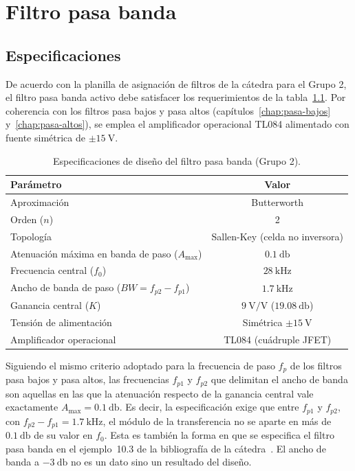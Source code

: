 \chapter{Filtro pasa banda}
\label{chap:pasa-banda}

\section{Especificaciones}
\label{sec:pbd-especificaciones}

De acuerdo con la planilla de asignación de filtros de la cátedra para el Grupo 2, el filtro pasa banda activo debe
satisfacer los requerimientos de la tabla~\ref{tab:pbd-especificaciones}. Por coherencia con los filtros pasa bajos y
pasa altos (capítulos~\ref{chap:pasa-bajos} y~\ref{chap:pasa-altos}), se emplea el amplificador operacional TL084
alimentado con fuente simétrica de $\pm\SI{15}{\volt}$.

\begin{table}[!ht]
  \centering
  \begin{tabular}{|l|c|}
    \hline
    Parámetro & Valor \\
    \hline
    Aproximación & Butterworth \\
    Orden ($n$) & 2 \\
    Topología & Sallen-Key (celda no inversora) \\
    Atenuación máxima en banda de paso ($A_{\max}$) & $\SI{0.1}{\decibel}$ \\
    Frecuencia central ($f_0$) & $\SI{28}{\kilo\hertz}$ \\
    Ancho de banda de paso ($BW = f_{p2} - f_{p1}$) & $\SI{1.7}{\kilo\hertz}$ \\
    Ganancia central ($K$) & $\SI{9}{\volt/\volt}$ ($\SI{19.08}{\decibel}$) \\
    Tensión de alimentación & Simétrica $\pm\SI{15}{\volt}$ \\
    Amplificador operacional & TL084 (cuádruple JFET) \\
    \hline
  \end{tabular}
  \caption{Especificaciones de diseño del filtro pasa banda (Grupo 2).}
  \label{tab:pbd-especificaciones}
\end{table}

Siguiendo el mismo criterio adoptado para la frecuencia de paso $f_p$ de los filtros pasa bajos y pasa altos, las
frecuencias $f_{p1}$ y $f_{p2}$ que delimitan el ancho de banda son aquellas en las que la atenuación respecto de la
ganancia central vale exactamente $A_{\max} = \SI{0.1}{\decibel}$. Es decir, la especificación exige que entre
$f_{p1}$ y $f_{p2}$, con $f_{p2} - f_{p1} = \SI{1.7}{\kilo\hertz}$, el módulo de la transferencia no se aparte en
más de $\SI{0.1}{\decibel}$ de su valor en $f_0$. Esta es también la forma en que se especifica el filtro pasa banda
en el ejemplo~10.3 de la bibliografía de la cátedra~\cite[sección~10.5.3]{barbero2024}. El ancho
de banda a $\SI{-3}{\decibel}$ no es un dato sino un resultado del diseño.


